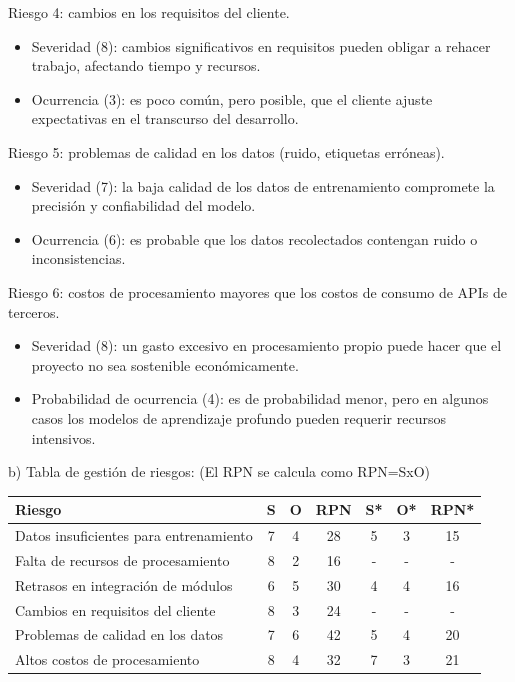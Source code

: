 \documentclass[
11pt, %
]{charter}
\begin{document}
Riesgo 4: cambios en los requisitos del cliente.
\begin{itemize}
	\item Severidad (8): cambios significativos en requisitos pueden obligar a rehacer trabajo, afectando tiempo y recursos.
	\item Ocurrencia (3): es poco común, pero posible, que el cliente ajuste expectativas en el transcurso del desarrollo.
\end{itemize}

Riesgo 5: problemas de calidad en los datos (ruido, etiquetas erróneas).
\begin{itemize}
	\item Severidad (7): la baja calidad de los datos de entrenamiento compromete la precisión y confiabilidad del modelo.
	\item Ocurrencia (6): es probable que los datos recolectados contengan ruido o inconsistencias.
\end{itemize}

Riesgo 6: costos de procesamiento mayores que los costos de consumo de APIs de terceros.
\begin{itemize}
	\item Severidad (8): un gasto excesivo en procesamiento propio puede hacer que el proyecto no sea sostenible económicamente.
	\item Probabilidad de ocurrencia (4): es de probabilidad menor, pero en algunos casos los modelos de aprendizaje profundo pueden requerir recursos intensivos.
\end{itemize}

b) Tabla de gestión de riesgos:      (El RPN se calcula como RPN=SxO)

\begin{table}[htpb]
\centering
\begin{tabularx}{\linewidth}{@{}|X|c|c|c|c|c|c|@{}}
\hline
\rowcolor[HTML]{C0C0C0} 
Riesgo & S & O & RPN & S* & O* & RPN* \\ \hline
Datos insuficientes para entrenamiento & 7 & 4 & 28 & 5 & 3 & 15 \\ \hline
Falta de recursos de procesamiento & 8 & 2 & 16 & - & - & - \\ \hline
Retrasos en integración de módulos & 6 & 5 & 30 & 4 & 4 & 16 \\ \hline
Cambios en requisitos del cliente & 8 & 3 & 24 & - & - & - \\ \hline
Problemas de calidad en los datos & 7 & 6 & 42 & 5 & 4 & 20 \\ \hline
Altos costos de procesamiento & 8 & 4 & 32 & 7 & 3 & 21 \\ \hline
\end{tabularx}%
\end{table}
\end{document}
